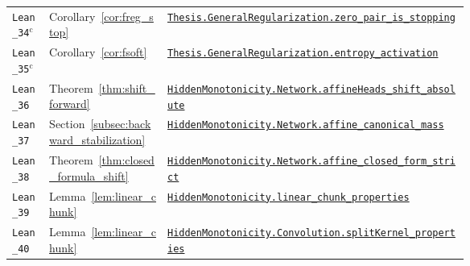 {\begin{longtable}{@{}l l >{\raggedright\arraybackslash}p{0.66\linewidth}@{}}
\texttt{Lean\_34}$^{\mathrm c}$ & Corollary~\ref{cor:freg_stop} & \href{https://github.com/JayPiZimmermann/A-Structural-Approach-to-Explainable-Deep-Learning/blob/b1c18a7ed02eadd720b0b693794ba7e7dd2628f6/formalization/Thesis/GeneralRegularization.lean\#L203}{\texttt{Thesis.\allowbreak GeneralRegularization.\allowbreak zero\_pair\_is\_stopping}} \\
\texttt{Lean\_35}$^{\mathrm c}$ & Corollary~\ref{cor:fsoft} & \href{https://github.com/JayPiZimmermann/A-Structural-Approach-to-Explainable-Deep-Learning/blob/b1c18a7ed02eadd720b0b693794ba7e7dd2628f6/formalization/Thesis/GeneralRegularization.lean\#L232}{\texttt{Thesis.\allowbreak GeneralRegularization.\allowbreak entropy\_activation}} \\
\texttt{Lean\_36} & Theorem~\ref{thm:shift_forward} & \href{https://github.com/JayPiZimmermann/A-Structural-Approach-to-Explainable-Deep-Learning/blob/b1c18a7ed02eadd720b0b693794ba7e7dd2628f6/formalization/HiddenMonotonicity/AffineHeads.lean\#L204}{\texttt{HiddenMonotonicity.\allowbreak Network.\allowbreak affineHeads\_shift\_absolute}} \\
\texttt{Lean\_37} & Section~\ref{subsec:backward_stabilization} & \href{https://github.com/JayPiZimmermann/A-Structural-Approach-to-Explainable-Deep-Learning/blob/b1c18a7ed02eadd720b0b693794ba7e7dd2628f6/formalization/HiddenMonotonicity/AffineHeads.lean\#L158}{\texttt{HiddenMonotonicity.\allowbreak Network.\allowbreak affine\_canonical\_mass}} \\
\texttt{Lean\_38} & Theorem~\ref{thm:closed_formula_shift} & \href{https://github.com/JayPiZimmermann/A-Structural-Approach-to-Explainable-Deep-Learning/blob/b1c18a7ed02eadd720b0b693794ba7e7dd2628f6/formalization/HiddenMonotonicity/AffineReadout.lean\#L163}{\texttt{HiddenMonotonicity.\allowbreak Network.\allowbreak affine\_closed\_form\_strict}} \\
\texttt{Lean\_39} & Lemma~\ref{lem:linear_chunk} & \href{https://github.com/JayPiZimmermann/A-Structural-Approach-to-Explainable-Deep-Learning/blob/b1c18a7ed02eadd720b0b693794ba7e7dd2628f6/formalization/HiddenMonotonicity/AffineChunk.lean\#L72}{\texttt{HiddenMonotonicity.\allowbreak linear\_chunk\_properties}} \\
\texttt{Lean\_40} & Lemma~\ref{lem:linear_chunk} & \href{https://github.com/JayPiZimmermann/A-Structural-Approach-to-Explainable-Deep-Learning/blob/b1c18a7ed02eadd720b0b693794ba7e7dd2628f6/formalization/HiddenMonotonicity/Convolution.lean\#L147}{\texttt{HiddenMonotonicity.\allowbreak Convolution.\allowbreak splitKernel\_properties}} \\

\end{longtable}}
